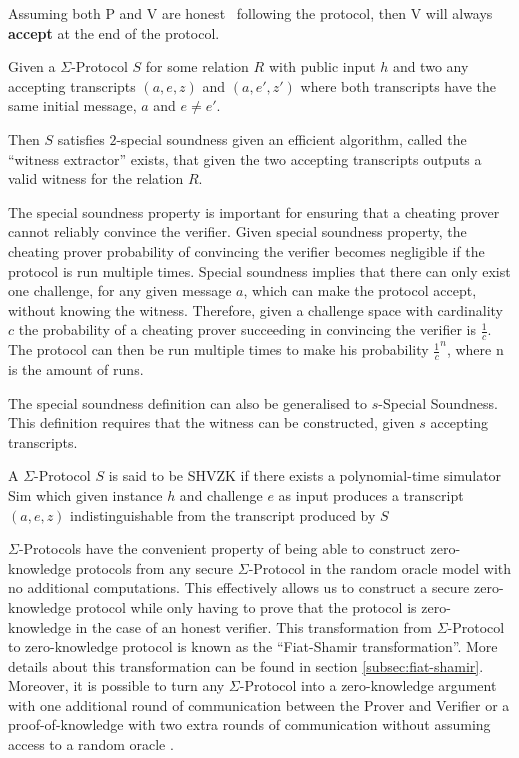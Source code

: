 \begin{definition}[Completeness]
  Assuming both P and V are honest \ie\ following the protocol, then V will always \textbf{accept} at
  the end of the protocol.
\end{definition}

\begin{definition}
Given a $\Sigma$-Protocol $S$ for some relation $R$ with public input $h$
and two any accepting transcripts $(a,e,z)$ and $(a,e',z')$
where both transcripts have the same initial message, $a$ and $e \neq e'$.

Then $S$ satisfies $2$-special soundness given an efficient
algorithm, called the ``witness extractor'' exists, that
given the two accepting transcripts outputs a valid witness for the relation $R$.
\end{definition}

The special soundness property is important for ensuring that a cheating prover
cannot reliably convince the verifier.
Given special soundness property, the cheating prover probability of convincing
the verifier becomes negligible if the protocol is run multiple times.
Special soundness implies that there can
only exist one challenge, for any given message $a$, which can make the
protocol accept, without knowing the witness. Therefore, given a challenge space
with cardinality $c$ the probability of a cheating prover succeeding in
convincing the verifier is $\frac{1}{c}$. The protocol can then be run multiple
times to make his probability $\frac{1}{c}^{n}$, where n is the amount of runs.

The special soundness definition can also be generalised to $s$-Special
Soundness. This definition requires that the witness can be constructed, given
$s$ accepting transcripts.

\begin{definition}
  A $\Sigma$-Protocol $S$ is said to be SHVZK if there exists a polynomial-time
  simulator Sim which given instance $h$ and challenge $e$ as input produces a
  transcript $(a,e,z)$ indistinguishable from the transcript produced by $S$
\end{definition}

$\Sigma$-Protocols have the convenient property of being able to construct
zero-knowledge protocols from any secure $\Sigma$-Protocol in the random oracle
model with no additional computations. This effectively allows us to construct a
secure zero-knowledge protocol while only having to prove that the protocol is
zero-knowledge in the case of an honest verifier. This transformation from
$\Sigma$-Protocol to zero-knowledge protocol is known as the ``Fiat-Shamir
transformation''. More details about this transformation can be found in section
\ref{subsec:fiat-shamir}.
Moreover, it is possible to turn any $\Sigma$-Protocol into a zero-knowledge
argument with one additional round of communication between the Prover and
Verifier or a proof-of-knowledge with two extra rounds of communication without
assuming access to a random oracle \cite{on-sigma-protocols}.


